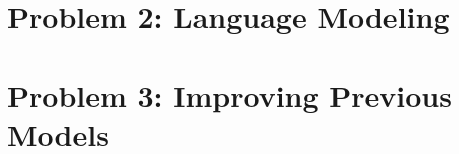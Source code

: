\documentclass[10pt]{article}
\theoremstyle{definition}
\begin{document}
\section{Problem 2: Language Modeling}
\section{Problem 3: Improving Previous Models}



\end{document}
